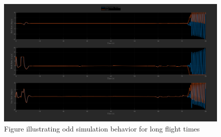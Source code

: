 \documentclass[12pt]{article}
\numberwithin{equation}{section}
\numberwithin{figure}{section}
\numberwithin{table}{section}
\begin{document}
\begin{figure}[H]
  \centering
  \includegraphics[width=1\textwidth]{Figures/bug.png}
  \caption{Figure illustrating odd simulation behavior for long flight times}
  \label{fig:bug}
\end{figure}

\nocite{*}

\end{document}
